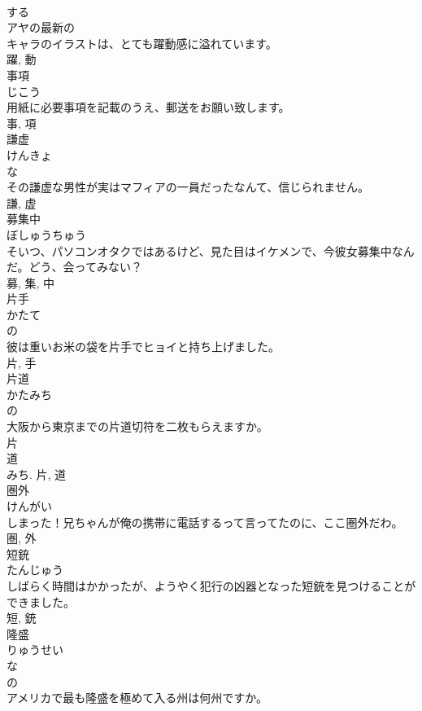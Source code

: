 \documentclass[8pt]{extreport}
\begin{document}
\begin{CJK}{UTF8}{min}
\\	する 
\\	アヤの最新の
\\	キャラのイラストは、とても躍動感に溢れています。	
\\	躍, 動	
\\	事項	
\\	じこう	
\\	用紙に必要事項を記載のうえ、郵送をお願い致します。	
\\	事, 項	
\\	謙虚	
\\	けんきょ	
\\	な 
\\	その謙虚な男性が実はマフィアの一員だったなんて、信じられません。	
\\	謙, 虚	
\\	募集中	
\\	ぼしゅうちゅう	
\\	そいつ、パソコンオタクではあるけど、見た目はイケメンで、今彼女募集中なんだ。どう、会ってみない？	
\\	募, 集, 中	
\\	片手	
\\	かたて	
\\	の 
\\	彼は重いお米の袋を片手でヒョイと持ち上げました。	
\\	片, 手	
\\	片道	
\\	かたみち	
\\	の 
\\	大阪から東京までの片道切符を二枚もらえますか。	
\\	片 
\\	道 
\\	みち.	片, 道	
\\	圏外	
\\	けんがい	
\\	しまった！兄ちゃんが俺の携帯に電話するって言ってたのに、ここ圏外だわ。	
\\	圏, 外	
\\	短銃	
\\	たんじゅう	
\\	しばらく時間はかかったが、ようやく犯行の凶器となった短銃を見つけることができました。	
\\	短, 銃	
\\	隆盛	
\\	りゅうせい	
\\	な 
\\	の 
\\	アメリカで最も隆盛を極めて入る州は何州ですか。	

\end{CJK}
\end{document}
